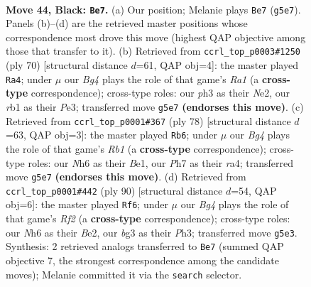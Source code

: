 \documentclass[11pt]{article}
\begin{document}
\clearpage

\begin{figure}[p]\centering
\begin{subfigure}{0.46\textwidth}\centering
\resizebox{\linewidth}{!}{%
\newchessgame
\chessboard[
  setfen={7r/p2r2kp/7n/P5b1/8/1Pp3BP/R1P1B1P1/1R4K1 b - - 4 44},
  showmover=false,
  pgfstyle=straightmove, color=movearrow, markmove={g5-e7}
]}
\caption{}
\end{subfigure}\hfill
\begin{subfigure}{0.46\textwidth}\centering
\resizebox{\linewidth}{!}{%
\newchessgame
\chessboard[
  setfen={5r2/5p1k/2r1pp1p/8/1b2p3/4P2P/4NPP1/R2R2K1 w - - 0 36},
  showmover=false,
  pgfstyle=straightmove, color=movearrow, markmove={a1-a4}
]}
\caption{}
\end{subfigure}
\\[4pt]
\begin{subfigure}{0.46\textwidth}\centering
\resizebox{\linewidth}{!}{%
\newchessgame
\chessboard[
  setfen={8/2r1k3/p4p2/7p/r1p1P1bP/4R3/6P1/1R2B1K1 w - - 0 40},
  showmover=false,
  pgfstyle=straightmove, color=movearrow, markmove={b1-b6}
]}
\caption{}
\end{subfigure}\hfill
\begin{subfigure}{0.46\textwidth}\centering
\resizebox{\linewidth}{!}{%
\newchessgame
\chessboard[
  setfen={8/2k1r2p/1pb3p1/p1n5/2P1p3/7P/P3BRP1/3R2K1 w - - 2 46},
  showmover=false,
  pgfstyle=straightmove, color=movearrow, markmove={f2-f6}
]}
\caption{}
\end{subfigure}
\caption{\textbf{Move 44, Black: \texttt{Be7}.} (a) Our position; Melanie plays \texttt{Be7} (\texttt{g5e7}). Panels (b)--(d) are the retrieved master positions whose correspondence most drove this move (highest QAP objective among those that transfer to it). (b) Retrieved from \texttt{ccrl\_top\_p0003\#1250} (ply 70) [structural distance $d$=61, QAP obj=4]: the master played \texttt{Ra4}; under $\mu$ our \emph{Bg4} plays the role of that game's \emph{Ra1} (a \textbf{cross-type} correspondence); cross-type roles: our \emph{p}h3 as their \emph{N}e2, our \emph{r}b1 as their \emph{P}e3; transferred move \texttt{g5e7} \textbf{(endorses this move)}. (c) Retrieved from \texttt{ccrl\_top\_p0001\#367} (ply 78) [structural distance $d$=63, QAP obj=3]: the master played \texttt{Rb6}; under $\mu$ our \emph{Bg4} plays the role of that game's \emph{Rb1} (a \textbf{cross-type} correspondence); cross-type roles: our \emph{N}h6 as their \emph{B}e1, our \emph{P}h7 as their \emph{r}a4; transferred move \texttt{g5e7} \textbf{(endorses this move)}. (d) Retrieved from \texttt{ccrl\_top\_p0001\#442} (ply 90) [structural distance $d$=54, QAP obj=6]: the master played \texttt{Rf6}; under $\mu$ our \emph{Bg4} plays the role of that game's \emph{Rf2} (a \textbf{cross-type} correspondence); cross-type roles: our \emph{N}h6 as their \emph{B}e2, our \emph{b}g3 as their \emph{P}h3; transferred move \texttt{g5e3}. Synthesis: 2 retrieved analogs transferred to \texttt{Be7} (summed QAP objective 7, the strongest correspondence among the candidate moves); Melanie committed it via the \texttt{search} selector.}
\label{fig:thought-m87}
\end{figure}
\end{document}
